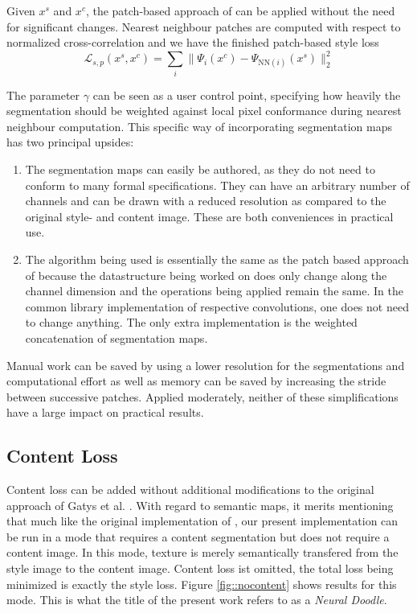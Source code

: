 Given \(x^s\) and \(x^c\), the patch-based approach of \cite{mrf2016} can be applied without the need for significant changes. Nearest neighbour patches are computed with respect to normalized cross-correlation and we have the finished patch-based style loss
\[\mathcal{L}_{s,p}(x^s,x^c) = \sum_i \|\Psi_i(x^c)-\Psi_{\text{NN}(i)}(x^s)\|_2^2\]

The parameter \(\gamma\) can be seen as a user control point, specifying how heavily the segmentation should be weighted against local pixel conformance during nearest neighbour computation. This specific way of incorporating segmentation maps has two principal upsides:
\begin{enumerate}
	\item The segmentation maps can easily be authored, as they do not need to conform to many formal specifications. They can have an arbitrary number of channels and can be drawn with a reduced resolution as compared to the original style- and content image. These are both conveniences in practical use.
	\item The algorithm being used is essentially the same as the patch based approach of \cite{mrf2016} because the datastructure being worked on does only change along the channel dimension and the operations being applied remain the same. In the common library implementation of respective convolutions, one does not need to change anything. The only extra implementation is the weighted concatenation of segmentation maps.
\end{enumerate}

Manual work can be saved by using a lower resolution for the segmentations and computational effort as well as memory can be saved by increasing the stride between successive patches. Applied moderately, neither of these simplifications have a large impact on practical results.

\subsection{Content Loss}

Content loss can be added without additional modifications to the original approach of Gatys et al. \cite{gatys2015neural}. With regard to semantic maps, it merits mentioning that much like the original implementation of \cite{doodles2016}, our present implementation can be run in a mode that requires a content segmentation but does not require a content image. In this mode, texture is merely semantically transfered from the style image to the content image. Content loss ist omitted, the total loss being minimized is exactly the style loss. Figure \ref{fig::nocontent} shows results for this mode. This is what the title of the present work refers to as a \emph{Neural Doodle}.

